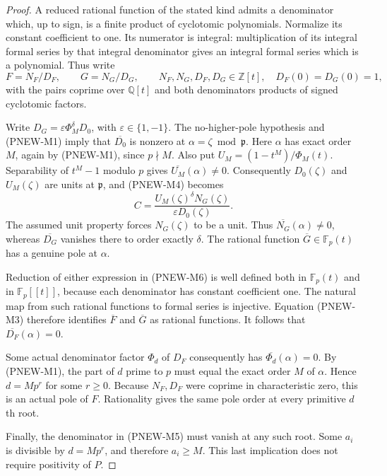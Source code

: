 \begin{proof}
A reduced rational function of the stated kind admits a
denominator which, up to sign, is a finite product of
cyclotomic polynomials. Normalize its constant coefficient
to one. Its numerator is integral: multiplication of its
integral formal series by that integral denominator gives
an integral formal series which is a polynomial. Thus write
\[
 F=N_F/D_F,\qquad G=N_G/D_G,
 \qquad N_F,N_G,D_F,D_G\in\mathbb Z[t],
 \quad D_F(0)=D_G(0)=1,
 \tag{PNEW-M6}
\]
with the pairs coprime over $\mathbb Q[t]$ and both denominators
products of signed cyclotomic factors.

Write
$D_G=\varepsilon\Phi_M^\delta D_0$, with $\varepsilon\in\{1,-1\}$.
The no-higher-pole hypothesis and (PNEW-M1) imply that
$\overline{D_0}$ is nonzero at
$\alpha=\zeta\bmod\mathfrak p$. Here $\alpha$ has exact
order $M$, again by (PNEW-M1), since $p\nmid M$.
Also put $U_M=(1-t^M)/\Phi_M(t)$.
Separability of $t^M-1$ modulo $p$ gives
$\overline{U_M}(\alpha)\ne0$.
Consequently $D_0(\zeta)$ and $U_M(\zeta)$ are units at
$\mathfrak p$, and (PNEW-M4) becomes
\[
                  C=
 \frac{U_M(\zeta)^\delta N_G(\zeta)}
      {\varepsilon D_0(\zeta)}.
 \tag{PNEW-M7}
\]
The assumed unit property forces $N_G(\zeta)$ to be a unit.
Thus $\overline{N_G}(\alpha)\ne0$, whereas
$\overline{D_G}$ vanishes there to order exactly $\delta$.
The rational function $\overline{G}\in\mathbb F_p(t)$ has
a genuine pole at $\alpha$.

Reduction of either expression in (PNEW-M6) is well defined
both in $\mathbb F_p(t)$ and in $\mathbb F_p[[t]]$, because
each denominator has constant coefficient one. The natural
map from such rational functions to formal series is
injective. Equation (PNEW-M3) therefore identifies
$\overline F$ and $\overline G$ as rational functions.
It follows that $\overline{D_F}(\alpha)=0$.

Some actual denominator factor $\Phi_d$ of $D_F$ consequently
has $\overline{\Phi_d}(\alpha)=0$. By (PNEW-M1), the part
of $d$ prime to $p$ must equal the exact order $M$ of
$\alpha$. Hence $d=Mp^r$ for some $r\ge0$.
Because $N_F,D_F$ were coprime in characteristic zero,
this is an actual pole of $F$. Rationality gives the same
pole order at every primitive $d$th root.

Finally, the denominator in (PNEW-M5) must vanish at any
such root. Some $a_i$ is divisible by $d=Mp^r$, and
therefore $a_i\ge M$. This last implication does not require
positivity of $P$.
\end{proof}

